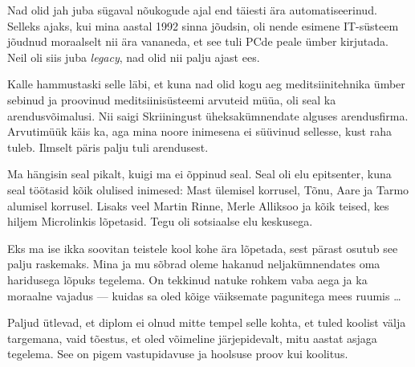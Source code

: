 
Nad olid jah juba sügaval nõukogude ajal end täiesti ära automatiseerinud. 
Selleks 
ajaks, kui mina aastal 1992 sinna jõudsin, oli nende esimene IT-süsteem 
jõudnud moraalselt nii ära vananeda, et see tuli PCde peale ümber 
kirjutada. Neil oli siis juba \emph{legacy}, nad olid nii palju ajast 
ees.


Kalle hammustaski selle läbi, et kuna nad olid kogu 
aeg meditsiinitehnika ümber sebinud ja proovinud meditsiinisüsteemi arvuteid 
müüa, oli seal ka arendusvõimalusi. Nii saigi Skriiningust 
üheksakümnendate alguses arendusfirma. Arvutimüük käis ka, aga mina  
noore inimesena ei süüvinud sellesse, kust raha tuleb. Ilmselt päris palju tuli 
arendusest.



Ma hängisin seal pikalt, kuigi ma ei õppinud seal. Seal oli 
elu epitsenter, kuna seal töötasid kõik olulised inimesed: 
Mast ülemisel korrusel, Tõnu, 
Aare ja Tarmo alumisel 
korrusel. Lisaks veel 
Martin Rinne, Merle Alliksoo ja kõik teised, kes hiljem Microlinkis lõpetasid. Tegu
oli sotsiaalse elu keskusega. 


Eks ma ise ikka soovitan teistele kool kohe 
ära lõpetada, sest pärast osutub see palju raskemaks. Mina ja mu sõbrad oleme 
hakanud 
neljakümnendates oma haridusega lõpuks tegelema. On 
tekkinud natuke rohkem vaba aega ja ka moraalne vajadus ---
kuidas sa oled kõige väiksemate pagunitega mees ruumis \ldots


Paljud ütlevad, et diplom ei olnud mitte tempel selle 
kohta, et tuled koolist välja targemana, vaid tõestus, et 
oled võimeline järjepidevalt, mitu aastat asjaga tegelema. See on pigem 
vastupidavuse ja hoolsuse proov kui koolitus.


